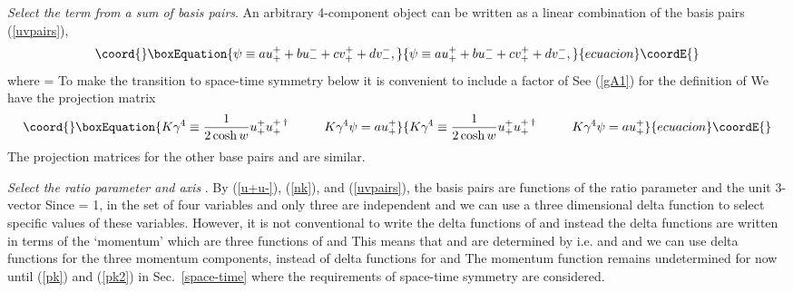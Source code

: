 \documentclass[a4paper,12pt]{article}
\begin{document}
	{\textit{Select the \coordHE{} term from a sum of basis pairs}}. An arbitrary 4-component object \myHighlight{$\psi,$}\coordHE{} can be written as a linear combination of the basis pairs (\ref{uvpairs}),
\begin{equation}\coord{}\boxEquation{ \label{psi,uv}
 \psi \equiv a  u_{+}^{+} + b u_{-}^{-} + c  v_{+}^{+} + d v_{-}^{-},
}{ \psi \equiv a  u_{+}^{+} + b u_{-}^{-} + c  v_{+}^{+} + d v_{-}^{-},
}{ecuacion}\coordE{}\end{equation}
where \coordHE{} = \coordHE{} To make the transition to space-time symmetry below it is convenient to include a factor of \coordHE{} See (\ref{gA1}) for the definition of \coordHE{} We have the projection matrix  
\begin{equation}\coord{}\boxEquation{ \label{K,u++}
K \gamma^{4} \equiv \frac{1}{2 \cosh{w}} u_{+}^{+} u_{+}^{+ \: \dagger}  \hspace{1cm} K \gamma^{4} \psi = a  u_{+}^{+}
}{ K \gamma^{4} \equiv \frac{1}{2 \cosh{w}} u_{+}^{+} u_{+}^{+ \: \dagger}  \hspace{1cm} K \gamma^{4} \psi = a  u_{+}^{+}
}{ecuacion}\coordE{}\end{equation}
The projection matrices for the other base pairs \coordHE{}  \coordHE{} and \coordHE{} are similar.
 
	{\textit{Select the ratio parameter \coordHE{} and axis \coordHE{}}}. By (\ref{u+u-}), (\ref{nk}), and (\ref{uvpairs}), the basis pairs are functions of the ratio parameter \coordHE{} and the unit 3-vector \coordHE{} Since \coordHE{} = 1, in the set of four variables \coordHE{} and \coordHE{} only three are independent and we can use a three dimensional delta function to select specific values of these variables. However, it is not conventional to write the delta functions of \coordHE{} and \coordHE{} instead the delta functions are written in terms of the `momentum' \coordHE{} which are three functions of \coordHE{} and \coordHE{}  \coordHE{} This means that \coordHE{} and \coordHE{} are determined by \coordHE{} i.e. \coordHE{} and \coordHE{} and we can use delta functions for the three momentum components, \coordHE{} instead of delta functions for \coordHE{} and \coordHE{} The momentum function \coordHE{} remains undetermined for now until (\ref{pk}) and (\ref{pk2}) in Sec.~\ref{space-time} where the requirements of space-time symmetry are considered.
\end{document}
